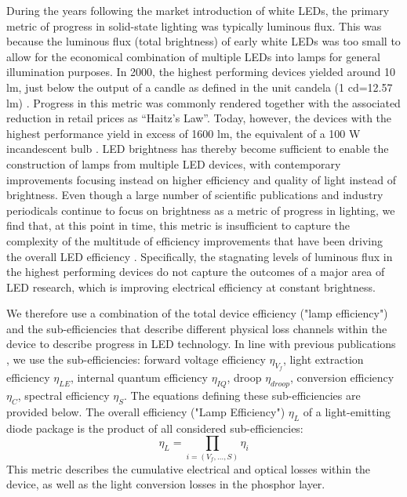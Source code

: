 \documentclass[parskip=full]{article}
\begin{document}
During the years following the market introduction of white LEDs, the primary metric of progress in solid-state lighting was typically luminous flux. This was because the luminous flux (total brightness) of early white LEDs was too small to allow for the economical combination of multiple LEDs into lamps for general illumination purposes. In 2000, the highest performing devices yielded around 10 lm, just below the output of a candle as defined in the unit candela (1 cd=12.57 lm) \cite{haitz2011solid}. Progress in this metric was commonly rendered together with the associated reduction in retail prices as “Haitz’s Law”\cite{haitz1999case,haitz2011solid}. Today, however, the devices with the highest performance yield in excess of 1600 lm, the equivalent of a 100 W incandescent bulb \cite{cree2020bright}. LED brightness has thereby become sufficient to enable the construction of lamps from multiple LED devices, with contemporary improvements focusing instead on higher efficiency and quality of light instead of brightness. Even though a large number of scientific publications and industry periodicals continue to focus on brightness as a metric of progress in lighting, we find that, at this point in time, this metric is insufficient to capture the complexity of the multitude of efficiency improvements that have been driving the overall LED efficiency \cite{weinold2021compound}. Specifically, the stagnating levels of luminous flux in the highest performing devices do not capture the outcomes of a major area of LED research, which is improving electrical efficiency at constant brightness.

We therefore use a combination of the total device efficiency ("lamp efficiency") and the sub-efficiencies that describe different physical loss channels within the device to describe progress in LED technology. In line with previous publications \cite{schubert2018light,tsao2010solid}, we use the sub-efficiencies: forward voltage efficiency $\eta_{V_f}$, light extraction efficiency $\eta_{LE}$, internal quantum efficiency $\eta_{IQ}$, droop $\eta_{droop}$, conversion efficiency $\eta_{C}$, spectral efficiency $\eta_{S}$. The equations defining these sub-efficiencies are provided below. The overall efficiency ("Lamp Efficiency") $\eta_L$ of a light-emitting diode package is the product of all considered sub-efficiencies:
%
\begin{equation}
    \eta_L = \prod_{i=(V_f, \dots, S)} \eta_i
\end{equation}
%
This metric describes the cumulative electrical and optical losses within the device, as well as the light conversion losses in the phosphor layer.
\end{document}
